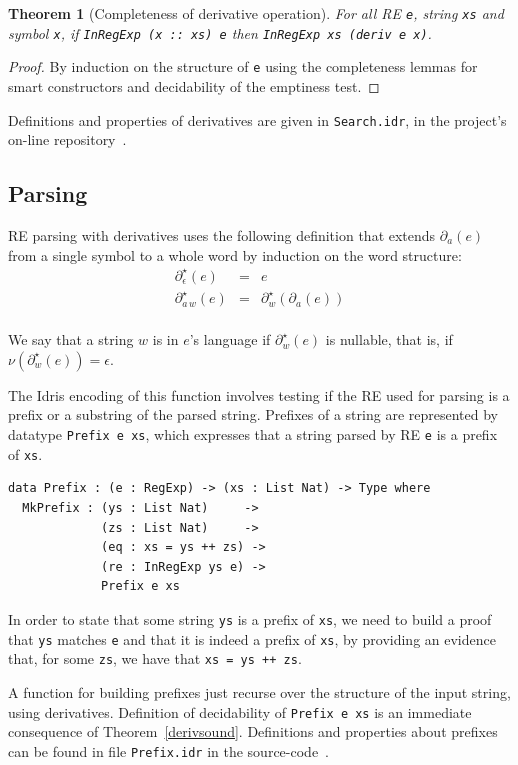 \documentclass{llncs}
\newcommand{\idris}[1]{\texttt{#1}}%
\newtheorem{Theorem}{Theorem}
\begin{document}
\begin{Theorem}[Completeness of derivative operation]\label{derivcomplete}
For all RE \idris{e}, string \idris{xs} and symbol \idris{x}, if
\idris{InRegExp (x :: xs) e} then \idris{InRegExp xs (deriv e x)}.
\end{Theorem}
\begin{proof}
  By induction on the structure of \idris{e} using the completeness
  lemmas for smart constructors and decidability of the emptiness
  test.
\end{proof}

Definitions and properties of derivatives are given in
\texttt{Search.idr}, in the project's on-line
repository~\cite{regex-rep}.
\subsection{Parsing}

RE parsing with derivatives uses the following definition that extends
$\partial_a(e)$ from a single symbol to a whole word by induction on
the word structure:
\[
\begin{array}{lcl}
  \partial_\epsilon^\star(e) & = & e\\
  \partial_{a\,w}^\star(e) & = & \partial_w^\star(\partial_a(e))\\
\end{array}
\]

We say that a string $w$ is in $e$'s language if
$\partial_{w}^\star(e)$ is nullable, that is, if
$\nu(\partial_{w}^\star(e)) = \epsilon$.

The Idris encoding of this function involves testing if the RE used
for parsing is a prefix or a substring of the parsed string. Prefixes
of a string are represented by datatype \idris{Prefix e xs}, which
expresses that a string parsed by RE \idris{e} is a prefix of
\idris{xs}.
\begin{verbatim}
data Prefix : (e : RegExp) -> (xs : List Nat) -> Type where
  MkPrefix : (ys : List Nat)     ->
             (zs : List Nat)     ->
             (eq : xs = ys ++ zs) ->
             (re : InRegExp ys e) ->
             Prefix e xs
\end{verbatim}
In order to state that some string \idris{ys} is a prefix of
\idris{xs}, we need to build a proof that \idris{ys} matches \idris{e}
and that it is indeed a prefix of \idris{xs}, by providing an evidence
that, for some \idris{zs}, we have that \idris{xs = ys ++ zs}.

A function for building prefixes just recurse over the structure of
the input string, using derivatives. Definition of decidability of
\idris{Prefix e xs} is an immediate consequence of
Theorem~\ref{derivsound}. Definitions and properties about prefixes
can be found in file \texttt{Prefix.idr} in the
source-code~\cite{regex-rep}.
\end{document}
